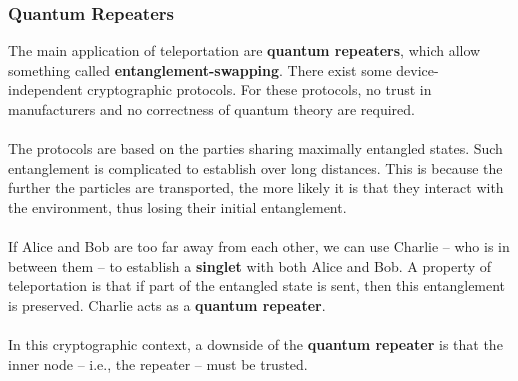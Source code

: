 \documentclass{article}
\begin{document}
\subsubsection{Quantum Repeaters}
The main application of teleportation are \textbf{quantum repeaters}, which allow something called \textbf{entanglement-swapping}. There exist some device-independent cryptographic protocols. For these protocols, no trust in manufacturers and no correctness of quantum theory are required. \\ \\
The protocols are based on the parties sharing maximally entangled states. Such entanglement is complicated to establish over long distances. This is because the further the particles are transported, the more likely it is that they interact with the environment, thus losing their initial entanglement. \\ \\
If Alice and Bob are too far away from each other, we can use Charlie -- who is in between them -- to establish a \textbf{singlet} with both Alice and Bob. A property of teleportation is that if part of the entangled state is sent, then this entanglement is preserved. Charlie acts as a \textbf{quantum repeater}. \\ \\
In this cryptographic context, a downside of the \textbf{quantum repeater} is that the inner node -- i.e., the repeater -- must be trusted.
\end{document}
